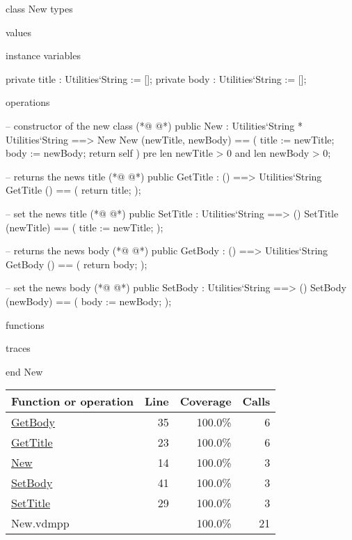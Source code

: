\begin{vdmpp}[breaklines=true]
class New
types

values

instance variables

 private title : Utilities`String := [];
 private body : Utilities`String := [];
 
operations

 -- constructor of the new class 
(*@
\label{New:14}
@*)
 public New : Utilities`String * Utilities`String ==> New
  New (newTitle, newBody) == (
   title := newTitle;
   body := newBody;
    return self
   )
   pre len newTitle > 0 and len newBody > 0;

 -- returns the news title
(*@
\label{GetTitle:23}
@*)
 public GetTitle : () ==> Utilities`String
  GetTitle () == (
   return title;
   ); 
   
 -- set the news title
(*@
\label{SetTitle:29}
@*)
 public SetTitle : Utilities`String ==> ()
  SetTitle (newTitle) == (
   title := newTitle;
   ); 
   
 -- returns the news body
(*@
\label{GetBody:35}
@*)
 public GetBody : () ==> Utilities`String
  GetBody () == (
   return body;
   ); 
   
 -- set the news body
(*@
\label{SetBody:41}
@*)
 public SetBody : Utilities`String ==> ()
  SetBody (newBody) == (
   body := newBody;
   );   

functions

traces

end New
\end{vdmpp}
\bigskip
\begin{longtable}{|l|r|r|r|}
\hline
Function or operation & Line & Coverage & Calls \\
\hline
\hline
\hyperref[GetBody:35]{GetBody} & 35&100.0\% & 6 \\
\hline
\hyperref[GetTitle:23]{GetTitle} & 23&100.0\% & 6 \\
\hline
\hyperref[New:14]{New} & 14&100.0\% & 3 \\
\hline
\hyperref[SetBody:41]{SetBody} & 41&100.0\% & 3 \\
\hline
\hyperref[SetTitle:29]{SetTitle} & 29&100.0\% & 3 \\
\hline
\hline
New.vdmpp & & 100.0\% & 21 \\
\hline
\end{longtable}


